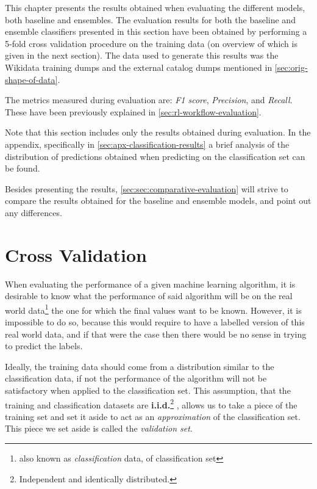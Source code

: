 \documentclass[epsfig,a4paper,11pt,titlepage,twoside,openany]{book}
\begin{document}
This chapter presents the results obtained when evaluating the different models, both baseline and ensembles. The evaluation results for both the baseline and ensemble classifiers presented in this section have been obtained by performing a 5-fold cross validation procedure on the training data (on overview of which is given in the next section). The data used to generate this results was the Wikidata training dumps and the external catalog dumps mentioned in \autoref{sec:orig-shape-of-data}.

The metrics measured during evaluation are: \textit{F1 score}, \textit{Precision}, and \textit{Recall}. These have been previously explained in \autoref{sec:rl-workflow-evaluation}. 

Note that this section includes only the results obtained during evaluation. In the appendix, specifically in \autoref{sec:apx-classification-results} a brief analysis of the distribution of predictions obtained when predicting on the classification set can be found.

Besides presenting the results, \autoref{sec:sec:comparative-evaluation} will strive to compare the results obtained for the baseline and ensemble models, and point out any differences.


\section{Cross Validation}
\label{sec:cross-validation}

When evaluating the performance of a given machine learning algorithm, it is desirable to know what the performance of said algorithm will be on the real world data\footnote{also known as \textit{classification} data, of classification set} the one for which the final values want to be known. However, it is impossible to do so, because this would require to have a labelled version of this real world data, and if that were the case then there would be no sense in trying to predict the labels. 

Ideally, the training data should come from a distribution similar to the classification data, if not the performance of the algorithm will not be satisfactory when applied to the classification set. This assumption, that the training and classification datasets are \textbf{i.i.d.}\footnote{Independent and identically distributed.} \cite{clauset2011brief}, allows us to take a piece of the training set and set it aside to act as an \textit{approximation} of the classification set. This piece we set aside is called the \textit{validation set}. 
\end{document}
